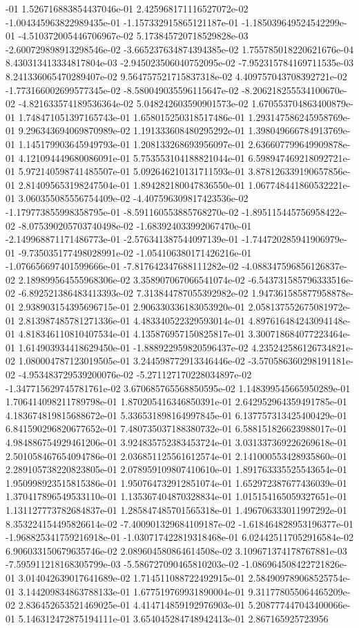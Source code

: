 -01	1.526716883854437046e-01	2.425968171116527072e-02	-1.004345963822989435e-01	-1.157332915865121187e-01	-1.185039649524542299e-01	-4.510372005446706967e-02	5.173845720718529828e-03	-2.600729898913298546e-02	-3.665237634874394385e-02	1.755785018220621676e-04	8.430313413334817804e-03	-2.945023506040752095e-02	-7.952315784169711535e-03	8.241336065470289407e-02	9.564757521715837318e-02	4.409757043708392721e-02	-1.773166002699577345e-02	-8.580049035596115647e-02	-8.206218255534100670e-02	-4.821633574189536364e-02	5.048242603590901573e-02	1.670553704863400879e-01	1.748471051397165743e-01	1.658015250318517486e-01	1.293147586245958769e-01	9.296343694069870989e-02	1.191333608480295292e-01	1.398049666784913769e-01	1.145179903645949793e-01	1.208133268693956097e-01	2.636607799649909878e-01	4.121094449680086091e-01	5.753553104188821044e-01	6.598947469218092721e-01	5.972140598741485507e-01	5.092646210131711593e-01	3.878126339190657856e-01	2.814095653198247504e-01	1.894282180047836550e-01	1.067748441860532221e-01	3.060355085556754409e-02	-4.407596309817423536e-02	-1.179773855998358795e-01	-8.591160553885768270e-02	-1.895115445756958422e-02	-8.075390205703740498e-02	-1.683924033992067470e-01	-2.149968871171486773e-01	-2.576341387544097139e-01	-1.744720285941906979e-01	-9.735035177498028991e-02	-1.054106380171426216e-01	-1.076656697401599666e-01	-7.817642347688111282e-02	-4.088347596856126837e-02	2.189899564555968306e-02	3.358907067066541074e-02	-6.543731585796333516e-02	-6.892521386483413393e-02	7.313844787055392982e-02	1.947361585877958878e-01	2.938903154395696715e-01	2.906330336183053920e-01	2.058137552675081972e-01	2.813987485781271336e-01	4.483340522329593014e-01	4.897616484243094148e-01	4.818346110810407534e-01	4.135876957150825817e-01	3.300718684077223464e-01	1.614903934418629450e-01	-1.888922959820596437e-02	4.235242586126734821e-02	1.080004787123019505e-01	3.244598772913346446e-02	-3.570586360298191181e-02	-4.953483729539200076e-02	-5.271127170228034897e-02	-1.347715629745781761e-02	3.670685765568850595e-02	1.148399545665950289e-01	1.706414098211789798e-01	1.870205416346850391e-01	2.642952964359491785e-01	4.183674819815688672e-01	5.336531898164997845e-01	6.137757313425400429e-01	6.841590296820677652e-01	7.480735037188380732e-01	6.588151826623988017e-01	4.984886754929461206e-01	3.924835752383453724e-01	3.031337369226269618e-01	2.501058467654094786e-01	2.036851125561612574e-01	2.141000553428935860e-01	2.289105738220823805e-01	2.078959109807410610e-01	1.891763335525543654e-01	1.950998923515815386e-01	1.950764732912851074e-01	1.652972387677436039e-01	1.370417896549533110e-01	1.135367404870328834e-01	1.015154165059327651e-01	1.131127773782684837e-01	1.285847485701565318e-01	1.496706333011997292e-01	8.353224154495826614e-02	-7.400901329684109187e-02	-1.618464828953196377e-01	-1.968825341759216918e-01	-1.030717422819318468e-01	6.024425117052916584e-02	6.906033150679635746e-02	2.089604580864614508e-02	3.109671374178767881e-03	-7.595911218168305799e-03	-5.586727090465810203e-02	-1.086964508422721826e-01	3.014042639017641689e-02	1.714511088722492915e-01	2.584909789068525754e-01	3.144209834863788133e-01	1.677519769931890004e-01	9.311778055064465209e-02	2.836452653521469025e-01	4.414714859192976903e-01	5.208777447043400066e-01	5.146312472875194111e-01	3.654045284748942413e-01	2.867165925723956